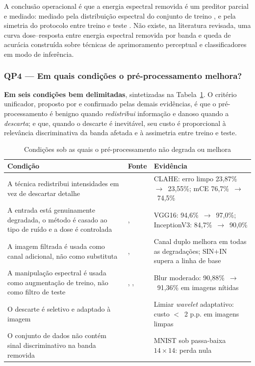 \documentclass[conference]{IEEEtran}
\begin{document}
A conclusão operacional é que a energia espectral removida é um preditor
parcial e mediado: mediado pela distribuição espectral do conjunto de treino
\cite{b16}, \cite{b22} e pela simetria do protocolo entre treino e teste
\cite{b23}. Não existe, na literatura revisada, uma curva dose--resposta entre
energia espectral removida por banda e queda de acurácia construída sobre
técnicas de aprimoramento perceptual e classificadores em modo de inferência.

\subsubsection{QP4 --- Em quais condições o pré-processamento melhora?}

\textbf{Em seis condições bem delimitadas}, sintetizadas na
Tabela~\ref{tab:condicoes}. O critério unificador, proposto por \cite{b6} e
confirmado pelas demais evidências, é que o pré-processamento é benigno quando
\emph{redistribui} informação e danoso quando a \emph{descarta}; e que, quando
o descarte é inevitável, seu custo é proporcional à relevância discriminativa
da banda afetada e à assimetria entre treino e teste.

\begin{table}[htbp]
\caption{Condições sob as quais o pré-processamento não degrada ou melhora}
\begin{center}
\footnotesize
\begin{tabular}{|p{3.0cm}|p{1.1cm}|p{2.5cm}|}
\hline
\textbf{Condição} & \textbf{Fonte} & \textbf{Evidência} \\
\hline
A técnica redistribui intensidades em vez de descartar detalhe & \cite{b6} &
CLAHE: erro limpo 23,87\%~$\rightarrow$~23,55\%; mCE
76,7\%~$\rightarrow$~74,5\% \\
\hline
A entrada está genuinamente degradada, o método é casado ao tipo de ruído e a
dose é controlada & \cite{b26}, \cite{b8} & VGG16:
94,6\%~$\rightarrow$~97,0\%; InceptionV3: 84,7\%~$\rightarrow$~90,0\% \\
\hline
A imagem filtrada é usada como canal adicional, não como substituta &
\cite{b9}, \cite{b16} & Canal duplo melhora em todas as degradações;
SIN$+$IN supera a linha de base \\
\hline
A manipulação espectral é usada como augmentação de treino, não como filtro de
teste & \cite{b4}, \cite{b28}, \cite{b29} & Blur moderado:
90,88\%~$\rightarrow$~91,36\% em imagens nítidas \\
\hline
O descarte é seletivo e adaptado à imagem & \cite{b11} & Limiar
\textit{wavelet} adaptativo: custo $<$~2 p.p. em imagens limpas \\
\hline
O conjunto de dados não contém sinal discriminativo na banda removida &
\cite{b23} & MNIST sob passa-baixa $14\times14$: perda nula \\
\hline
\end{tabular}
\label{tab:condicoes}
\end{center}
\end{table}
\end{document}
